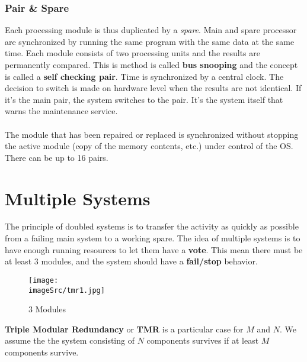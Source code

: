 \documentclass[../main.tex]{subfiles}
\begin{document}
\subsubsection{Pair \& Spare}
Each processing module is thus duplicated by a \textit{spare}. Main and spare processor are synchronized by running the same program with the same data at the same time. Each module consists of two processing units and the results are permanently compared. This is method is called \textbf{bus snooping} and the concept is called a \textbf{self checking pair}. Time is synchronized by a central clock. The decision to switch is made on hardware level when the results are not identical. If it's the main pair, the system switches to the pair. It's the system itself that warns the maintenance service. 
\\\\
The module that has been repaired or replaced is synchronized without stopping the active module (copy of the memory contents, etc.) under control of the OS. There can be up to 16 pairs.

\section{Multiple Systems}
The principle of doubled systems is to transfer the activity as quickly as possible from a failing main system to a working spare. The idea of multiple systems is to have enough running resources to let them have a \textbf{vote}. This mean there must be at least 3 modules, and the system should have a \textbf{fail/stop} behavior.

\begin{figure}[h!]
    \centering
    \texttt{[image: \\imageSrc/tmr1.jpg]}
    \caption{3 Modules}
    \label{tmr1}
\end{figure}
\textbf{Triple Modular Redundancy} or \textbf{TMR} is a particular case for $M$ and $N$. We assume the the system consisting of $N$ components survives if at least $M$ components survive.
\end{document}
